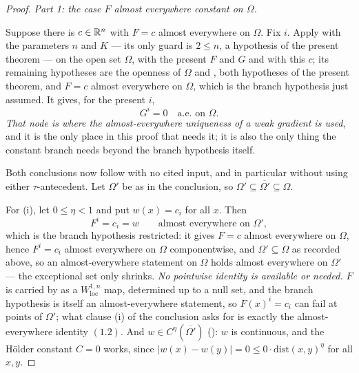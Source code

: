 \begin{proof}
\medskip
\noindent\emph{Part 1: the case $F$ almost everywhere constant on $\Omega$.}

Suppose there is $c\in\mathbb{R}^n$ with $F=c$ almost everywhere on $\Omega$.  Fix $i$.
Apply  with the parameters $n$ and $K$ --- its
only guard is $2\le n$, a hypothesis of the present theorem --- on the open set
$\Omega$, with the present $F$ and $G$ and with this $c$; its remaining
hypotheses are the openness of $\Omega$ and , both
hypotheses of the present theorem, and $F=c$ almost everywhere on $\Omega$, which
is the branch hypothesis just assumed.  It gives, for the present $i$,
\[
G^i=0\quad\text{a.e.\ on }\Omega .
\tag{1.1}
\]
\emph{That node is where the almost-everywhere uniqueness of a weak gradient is
used}, and it is the only place in this proof that needs it; it is also the only
thing the constant branch needs beyond the branch hypothesis itself.

Both conclusions now follow with no cited input, and in particular without using
either $\tau$-antecedent.  Let $\Omega'$ be as in the conclusion, so
$\Omega'\subseteq\overline{\Omega'}\subseteq\Omega$.

For (i), let $0\le\eta<1$ and put $w(x)=c_i$ for all $x$.  Then
\[
F^i=c_i=w\qquad\text{almost everywhere on }\Omega' ,
\tag{1.2}
\]
which is the branch hypothesis restricted: it gives $F=c$ almost everywhere on
$\Omega$, hence $F^i=c_i$ almost everywhere on $\Omega$ componentwise, and
$\Omega'\subseteq\Omega$ as recorded above, so an almost-everywhere statement on
$\Omega$ holds almost everywhere on $\Omega'$ --- the exceptional set only
shrinks.  \emph{No pointwise identity is available or needed.}  $F$ is carried by
 as a $W^{1,n}_{\mathrm{loc}}$ map, determined up to a
null set, and the branch hypothesis is itself an almost-everywhere statement, so
$F(x)^i=c_i$ can fail at points of $\Omega'$; what clause (i) of the conclusion
asks for is exactly the almost-everywhere identity $(1.2)$.  And
$w\in C^\eta(\overline{\Omega'})$ (): $w$ is continuous, and
the H\"older constant $C=0$ works, since $|w(x)-w(y)|=0\le0\cdot\mathrm{dist}
(x,y)^\eta$ for all $x,y$.


\end{proof}
